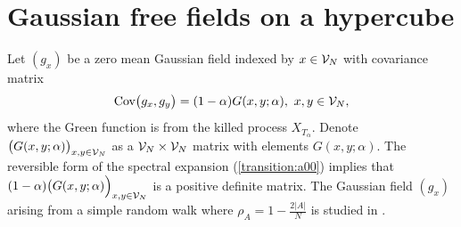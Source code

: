 \documentclass[preprint,11pt]{elsarticle}
\theoremstyle{remark}
\begin{document}
{\section{Gaussian free fields on a hypercube}\label{Gauss:sec}
Let $(g_x)$ be a zero mean Gaussian field indexed by $x\in {\cal V}_N$ with covariance matrix 
\begin{equation*} 
\text{Cov}\big (g_x,g_y\big ) = (1-\alpha)G(x,y;\alpha),\ x,y \in {\cal V}_N,
\label{definition:00}
\end{equation*}
where the Green function is from the killed process $X_{T_\alpha}$.
Denote 
$\big (G(x,y;\alpha)\big )_{ x,y\in {\cal V}_N  }$ 
as a 
${\cal V}_N\times {\cal V}_N$ matrix with elements $G(x,y;\alpha)$.
The reversible form of the spectral expansion (\ref{transition:a00}) implies that $(1-\alpha)\big (G(x,y;\alpha)\Big )_{x,y\in {\cal V}_N}$ is a positive definite matrix. The Gaussian field $(g_x)$ arising from a simple random walk where $\rho_A = 1 - \frac{2|A|}{N}$ is studied in \cite{CG2025}.

}
\end{document}
